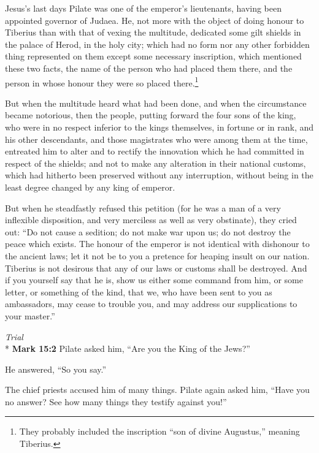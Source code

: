 \documentclass[10pt,twoside]{article} %
\newcommand{\quotesize}{\normalsize{}}
\newenvironment{quotetext}{\begingroup\quotesize}{\endgroup}
\newcommand{\intex}[1]{\index[texts]{#1}}
\newcommand{\bible}[2]{\begin{quotetext}\textbf{#1}\intex{#1} #2\end{quotetext}}
\newcommand{\gospelmark}[2]{\bible{Mark #1}{#2}}
\newcommand{\subhead}[1]{\emph{#1}\\*}
\begin{document}
\begin{section}{Jesus's last days}
\begin{quotetext}
Pilate was one of the emperor's lieutenants, having been appointed
governor of Judaea. He, not more with the object of doing honour to
Tiberius than with that of vexing the multitude, dedicated some gilt
shields in the palace of Herod, in the holy city; which had no form
nor any other forbidden thing represented on them except some
necessary inscription, which mentioned these two facts, the name of
the person who had placed them there, and the person in whose honour
they were so placed there.\footnote{They probably included the inscription ``son of divine Augustus,'' meaning Tiberius.} 

But when the multitude heard what had been
done, and when the circumstance became notorious, then the people,
putting forward the four sons of the king, who were in no respect
inferior to the kings themselves, in fortune or in rank, and his other
descendants, and those magistrates who were among them at the time,
entreated him to alter and to rectify the innovation which he had
committed in respect of the shields; and not to make any alteration in
their national customs, which had hitherto been preserved without any
interruption, without being in the least degree changed by any king of
emperor.

But when he steadfastly refused this petition (for he was a
man of a very inflexible disposition, and very merciless as well as
very obstinate), they cried out: ``Do not cause a sedition; do not make
war upon us; do not destroy the peace which exists. The honour of the
emperor is not identical with dishonour to the ancient laws; let it
not be to you a pretence for heaping insult on our nation. Tiberius is
not desirous that any of our laws or customs shall be destroyed. And
if you yourself say that he is, show us either some command from him,
or some letter, or something of the kind, that we, who have been sent
to you as ambassadors, may cease to trouble you, and may address our
supplications to your master.''
\end{quotetext}


\subhead{Trial}
\gospelmark{15:2}{
Pilate asked him, ``Are you the King of the Jews?''

He answered, ``So you say.''

  The chief priests accused him of many things.   Pilate again asked him, ``Have you no answer? See how many things they testify against you!''

}
\end{section}
\end{document}
